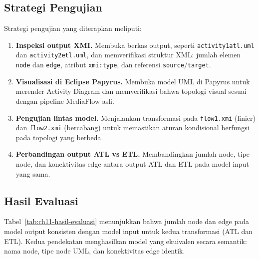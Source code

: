 \subsection{Strategi Pengujian}

Strategi pengujian yang diterapkan meliputi:
\begin{enumerate}
  \item \textbf{Inspeksi output XMI.} Membuka berkas output, seperti \texttt{activity1atl.uml} dan \texttt{activity2etl.uml}, dan memverifikasi struktur XML: jumlah elemen \texttt{node} dan \texttt{edge}, atribut \texttt{xmi:type}, dan referensi \texttt{source}/\texttt{target}.
  \item \textbf{Visualisasi di Eclipse Papyrus.} Membuka model UML di Papyrus untuk merender Activity Diagram dan memverifikasi bahwa topologi visual sesuai dengan pipeline MediaFlow asli.
  \item \textbf{Pengujian lintas model.} Menjalankan transformasi pada \texttt{flow1.xmi} (linier) dan \texttt{flow2.xmi} (bercabang) untuk memastikan aturan kondisional berfungsi pada topologi yang berbeda.
  \item \textbf{Perbandingan output ATL vs ETL.} Membandingkan jumlah node, tipe node, dan konektivitas edge antara output ATL dan ETL pada model input yang sama.
\end{enumerate}

\subsection{Hasil Evaluasi}

\begin{table}[h]
\centering
\caption{Hasil evaluasi transformasi pada dua model input}
\label{tab:ch11-hasil-evaluasi}
\footnotesize
{}
\normalsize
\end{table}

\noindent Tabel~\ref{tab:ch11-hasil-evaluasi} menunjukkan bahwa jumlah node dan edge pada model output konsisten dengan model input untuk kedua transformasi (ATL dan ETL). Kedua pendekatan menghasilkan model yang ekuivalen secara semantik: nama node, tipe node UML, dan konektivitas edge identik.

